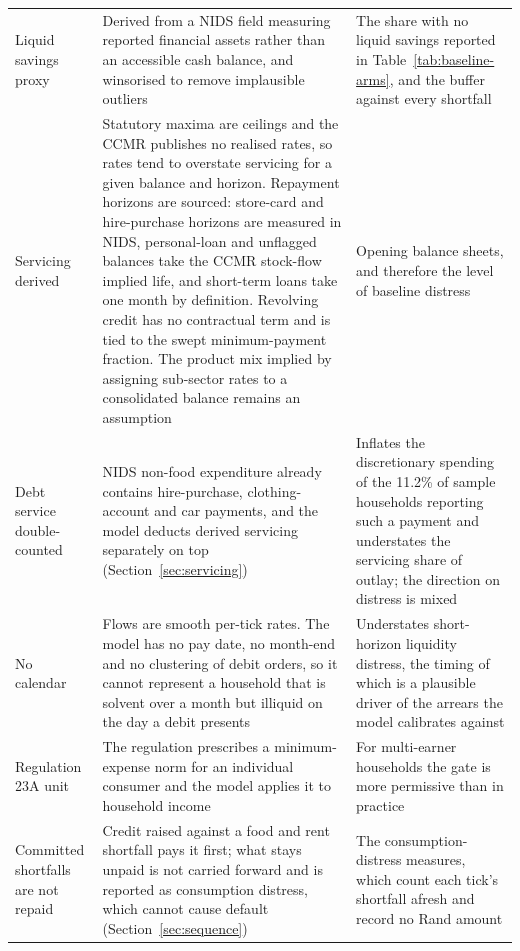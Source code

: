 \begin{longtable}{@{}L{3.1cm}L{6.5cm}L{4.45cm}@{}}
\addlinespace
Liquid savings proxy & Derived from a \ac{NIDS} field measuring reported financial assets rather
than an accessible cash balance, and winsorised to remove implausible outliers & The share with
no liquid savings reported in Table~\ref{tab:baseline-arms}, and the buffer against every
shortfall \\
\addlinespace
Servicing derived & Statutory maxima are ceilings and the \ac{CCMR} publishes no realised rates,
so rates tend to overstate servicing for a given balance and horizon. Repayment horizons are
sourced: store-card and hire-purchase horizons are measured in \ac{NIDS}, personal-loan and
unflagged balances take the \ac{CCMR} stock-flow implied life, and short-term loans take one month
by definition. Revolving credit has no contractual term and is tied to the swept minimum-payment
fraction. The product mix implied by
assigning sub-sector rates to a consolidated balance remains an assumption
& Opening balance sheets, and therefore the level of baseline distress \\
\addlinespace
Debt service double-counted & \ac{NIDS} non-food expenditure already contains hire-purchase,
clothing-account and car payments, and the model deducts derived servicing separately on top
(Section~\ref{sec:servicing}) & Inflates the discretionary spending of the 11.2\% of sample households
reporting such a payment and understates the servicing share of outlay; the direction on distress
is mixed \\
\addlinespace
No calendar & Flows are smooth per-tick rates. The model has no pay date, no month-end and no
clustering of debit orders, so it cannot represent a household that is solvent over a month but
illiquid on the day a debit presents & Understates short-horizon liquidity distress, the timing of
which is a plausible driver of the arrears the model calibrates against \\
\addlinespace
Regulation 23A unit & The regulation prescribes a minimum-expense norm for an individual consumer
and the model applies it to household income & For multi-earner households the gate is more
permissive than in practice \\
\addlinespace
Committed shortfalls are not repaid & Credit raised against a food and rent shortfall pays it first; what stays unpaid is not carried forward and is reported as consumption distress, which cannot cause default (Section~\ref{sec:sequence}) & The consumption-distress measures, which count each tick's shortfall afresh and record no Rand amount \\

\end{longtable}
